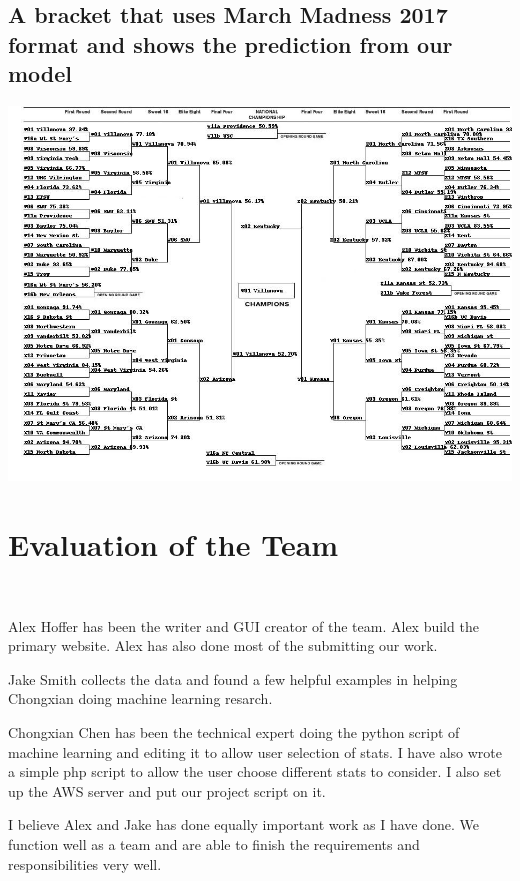 \documentclass[letterpaper, 10pt,titlepage]{article}
\begin{document}
\newpage
\subsection{ A bracket that uses March Madness 2017 format and shows the prediction from our model}
\bigbreak
\includegraphics[width=1\textwidth]{bracket.jpg}

\newpage

\section{Evaluation of the Team}
\
\par Alex Hoffer has been the writer and GUI creator of the team. Alex build the primary website. Alex has also done most of the submitting our work.
\par Jake Smith collects the data and found a few helpful examples in helping Chongxian doing machine learning resarch.
\par Chongxian Chen has been the technical expert doing the python script of machine learning and editing it to allow user selection of stats. I have also wrote a simple php script to allow the user choose different stats to consider. I also set up the AWS server and put our project script on it.
\par I believe Alex and Jake has done equally important work as I have done. We function well as a team and are able to finish the requirements and responsibilities very well. 
\end{document}
